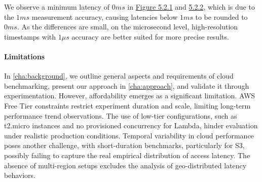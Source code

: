 We observe a minimum latency of $0ms$ in \hyperref[fig:bar_rds_const]{Figure 5.2.1} and \hyperref[fig:bar_rds_bursty]{5.2.2}, which is due to the $1ms$ measurement accuracy, causing latencies below $1ms$ to be rounded to $0ms$. As the differences are small, on the microsecond level, high-resolution timestamps with $1\mu s$ accuracy are better suited for more precise results.

\paragraph*{Limitations} In \cref{cha:background}, we outline general aspects and requirements of cloud benchmarking, present our approach in \cref{cha:approach}, and validate it through experimentation. However, affordability emerges as a significant limitation. AWS Free Tier constraints restrict experiment duration and scale, limiting long-term performance trend observations. The use of low-tier configurations, such as t2.micro instances and no provisioned concurrency for Lambda, hinder evaluation under realistic production conditions. Temporal variability in cloud performance poses another challenge, with short-duration benchmarks, particularly for S3, possibly failing to capture the real empirical distribution of access latency. The absence of multi-region setups excludes the analysis of geo-distributed latency behaviors.
